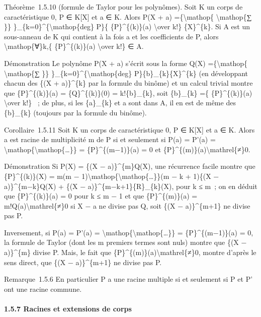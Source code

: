 \documentclass[]{article}
\begin{document}
Théorème~1.5.10 (formule de Taylor pour les polynômes). Soit K un corps
de caractéristique 0, P ∈ K{[}X{]} et a ∈ K. Alors P(X + a)
=\{\textbackslash{}mathop\{ \textbackslash{}mathop\{∑ \}\}
\}\_\{k=0\}\^{}\{\textbackslash{}mathop\{deg\} P\}\{ \{P\}\^{}\{(k)\}(a)
\textbackslash{}over k!\} \{X\}\^{}\{k\}. Si A est un sous-anneau de K
qui contient à la fois a et les coefficients de P, alors
\textbackslash{}mathop\{∀\}k,\{ \{P\}\^{}\{(k)\}(a) \textbackslash{}over
k!\} ∈ A.

Démonstration Le polynôme P(X + a) s'écrit sous la forme Q(X)
=\{\textbackslash{}mathop\{ \textbackslash{}mathop\{∑ \}\}
\}\_\{k=0\}\^{}\{\textbackslash{}mathop\{deg\}
P\}\{b\}\_\{k\}\{X\}\^{}\{k\} (en développant chacun des \{(X +
a)\}\^{}\{k\} par la formule du binôme) et un calcul trivial montre que
\{P\}\^{}\{(k)\}(a) = \{Q\}\^{}\{(k)\}(0) = k!\{b\}\_\{k\}, soit
\{b\}\_\{k\} =\{ \{P\}\^{}\{(k)\}(a) \textbackslash{}over k!\} ~; de
plus, si les \{a\}\_\{k\} et a sont dans A, il en est de même des
\{b\}\_\{k\} (toujours par la formule du binôme).

Corollaire~1.5.11 Soit K un corps de caractéristique 0, P ∈ K{[}X{]} et
a ∈ K. Alors a est racine de multiplicité m de P si et seulement si P(a)
= P'(a) = \textbackslash{}mathop\{\textbackslash{}mathop\{\ldots{}\}\} =
\{P\}\^{}\{(m−1)\}(a) = 0 et
\{P\}\^{}\{(m)\}(a)\textbackslash{}mathrel\{≠\}0.

Démonstration Si P(X) = \{(X − a)\}\^{}\{m\}Q(X), une récurrence facile
montre que \{P\}\^{}\{(k)\}(X) = m(m −
1)\textbackslash{}mathop\{\textbackslash{}mathop\{\ldots{}\}\}(m − k +
1)\{(X − a)\}\^{}\{m−k\}Q(X) + \{(X − a)\}\^{}\{m−k+1\}\{R\}\_\{k\}(X),
pour k ≤ m~; on en déduit que \{P\}\^{}\{(k)\}(a) = 0 pour k ≤ m − 1 et
que \{P\}\^{}\{(m)\}(a) = m!Q(a)\textbackslash{}mathrel\{≠\}0 si X − a
ne divise pas Q, soit \{(X − a)\}\^{}\{m+1\} ne divise pas P.

Inversement, si P(a) = P'(a) =
\textbackslash{}mathop\{\textbackslash{}mathop\{\ldots{}\}\} =
\{P\}\^{}\{(m−1)\}(a) = 0, la formule de Taylor (dont les m premiers
termes sont nuls) montre que \{(X − a)\}\^{}\{m\} divise P. Mais, le
fait que \{P\}\^{}\{(m)\}(a)\textbackslash{}mathrel\{≠\}0, montre
d'après le sens direct, que \{(X − a)\}\^{}\{m+1\} ne divise pas P.

Remarque~1.5.6 En particulier P a une racine multiple si et seulement si
P et P' ont une racine commune.

\paragraph{1.5.7 Racines et extensions de corps}
\end{document}
